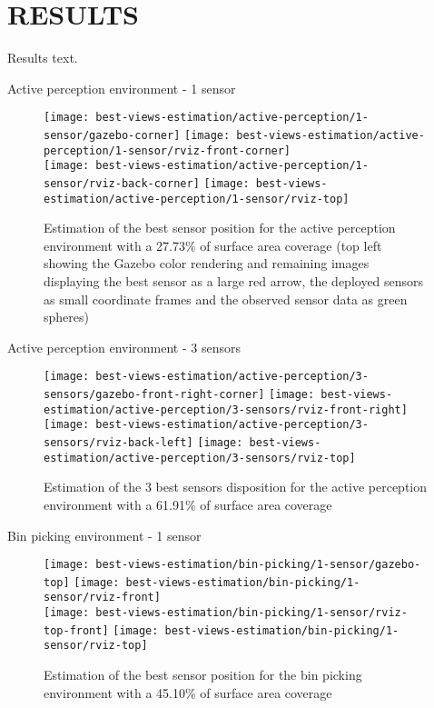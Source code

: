 \section{\uppercase{Results}}\label{sec:results}

\noindent Results text.

Active perception environment - 1 sensor

\begin{figure}
	\centering
	\texttt{[image: best-views-estimation/active-perception/1-sensor/gazebo-corner]}\hspace{4em}
	\texttt{[image: best-views-estimation/active-perception/1-sensor/rviz-front-corner]}\\
	\texttt{[image: best-views-estimation/active-perception/1-sensor/rviz-back-corner]}\hspace{2em}
	\texttt{[image: best-views-estimation/active-perception/1-sensor/rviz-top]}
	\caption{Estimation of the best sensor position for the active perception environment with a 27.73\% of surface area coverage (top left showing the Gazebo color rendering and remaining images displaying the best sensor as a large red arrow, the deployed sensors as small coordinate frames and the observed sensor data as green spheres)}
\end{figure}


Active perception environment - 3 sensors

\begin{figure}
	\centering
	\texttt{[image: best-views-estimation/active-perception/3-sensors/gazebo-front-right-corner]}\hspace{4em}
	\texttt{[image: best-views-estimation/active-perception/3-sensors/rviz-front-right]}\\
	\texttt{[image: best-views-estimation/active-perception/3-sensors/rviz-back-left]}\hspace{2em}
	\texttt{[image: best-views-estimation/active-perception/3-sensors/rviz-top]}
	\caption{Estimation of the 3 best sensors disposition for the active perception environment with a 61.91\% of surface area coverage}
\end{figure}


Bin picking environment - 1 sensor

\begin{figure}
	\centering
	\texttt{[image: best-views-estimation/bin-picking/1-sensor/gazebo-top]}\hspace{2em}
	\texttt{[image: best-views-estimation/bin-picking/1-sensor/rviz-front]}\\
	\texttt{[image: best-views-estimation/bin-picking/1-sensor/rviz-top-front]}\hspace{2em}
	\texttt{[image: best-views-estimation/bin-picking/1-sensor/rviz-top]}
	\caption{Estimation of the best sensor position for the bin picking environment with a 45.10\% of surface area coverage}
\end{figure}


